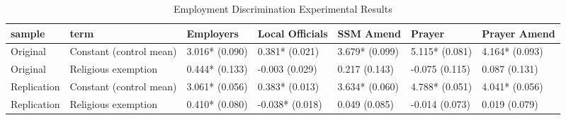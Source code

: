 \begin{table}[!h]
\centering
\caption{\label{tab:employment}Employment Discrimination Experimental Results}
\centering
\begin{tabular}[t]{lllllll}
\toprule
sample & term & Employers & Local Officials & SSM Amend & Prayer & Prayer Amend\\
\midrule
Original & Constant (control mean) & 3.016*
(0.090) & 0.381*
(0.021) & 3.679*
(0.099) & 5.115*
(0.081) & 4.164*
(0.093)\\
Original & Religious exemption & 0.444*
(0.133) & -0.003
(0.029) & 0.217
(0.143) & -0.075
(0.115) & 0.087
(0.131)\\
Replication & Constant (control mean) & 3.061*
(0.056) & 0.383*
(0.013) & 3.634*
(0.060) & 4.788*
(0.051) & 4.041*
(0.056)\\
Replication & Religious exemption & 0.410*
(0.080) & -0.038*
(0.018) & 0.049
(0.085) & -0.014
(0.073) & 0.019
(0.079)\\
\bottomrule
\end{tabular}
\end{table}
